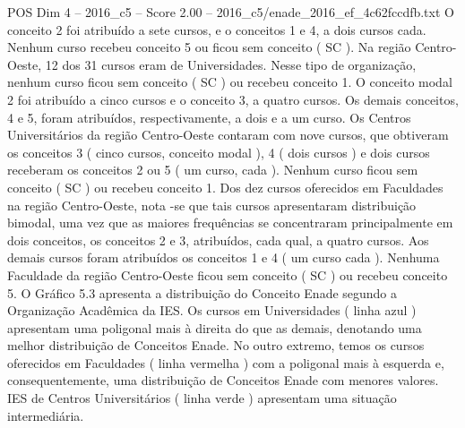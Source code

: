 \begin{textsample}{POS Dim 4 – 2016\_c5 – Score 2.00 – 2016\_c5/enade\_2016\_ef\_4c62fccdfb.txt}
O conceito 2 foi atribuído a sete cursos, e o conceitos 1 e 4, a dois cursos cada.
Nenhum curso recebeu conceito 5 ou ficou sem conceito ( SC ).
Na região Centro-Oeste, 12 dos 31 cursos eram de Universidades.
Nesse tipo de organização, nenhum curso ficou sem conceito ( SC ) ou recebeu conceito 1.
O conceito modal 2 foi atribuído a cinco cursos e o conceito 3, a quatro cursos.
Os demais conceitos, 4 e 5, foram atribuídos, respectivamente, a dois e a um curso.
Os Centros Universitários da região Centro-Oeste contaram com nove cursos, que obtiveram os conceitos 3 ( cinco cursos, conceito modal ), 4 ( dois cursos ) e dois cursos receberam os conceitos 2 ou 5 ( um curso, cada ).
Nenhum curso ficou sem conceito ( SC ) ou recebeu conceito 1.
Dos dez cursos oferecidos em Faculdades na região Centro-Oeste, nota -se que tais cursos apresentaram distribuição bimodal, uma vez que as maiores frequências se concentraram principalmente em dois conceitos, os conceitos 2 e 3, atribuídos, cada qual, a quatro cursos.
Aos demais cursos foram atribuídos os conceitos 1 e 4 ( um curso cada ).
Nenhuma Faculdade da região Centro-Oeste ficou sem conceito ( SC ) ou recebeu conceito 5.
O Gráfico 5.3 apresenta a distribuição do Conceito Enade segundo a Organização Acadêmica da IES.
Os cursos em Universidades ( linha azul ) apresentam uma poligonal mais à direita do que as demais, denotando uma melhor distribuição de Conceitos Enade.
No outro extremo, temos os cursos oferecidos em Faculdades ( linha vermelha ) com a poligonal mais à esquerda e, consequentemente, uma distribuição de Conceitos Enade com menores valores.
IES de Centros Universitários ( linha verde ) apresentam uma situação intermediária.

\end{textsample}
